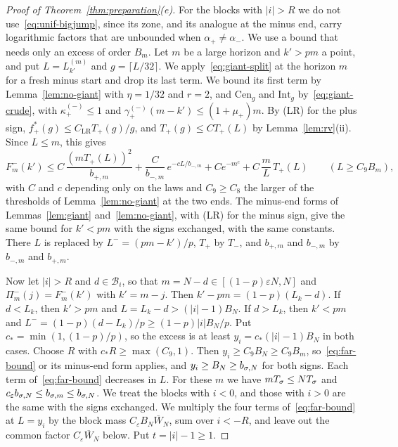 \begin{proof}[Proof of Theorem~\ref{thm:preparation}(e)]
For the blocks with $|i|>R$ we do not use~\eqref{eq:unif-bigjump}, since its zone,
and its analogue at the minus end, carry logarithmic factors that are unbounded when
$\alpha_\plus\ne\alpha_\minus$. We use a bound that needs only an excess of order
$B_m$. Let $m$ be a large horizon and $k'>pm$ a point, and put $L=L^{(m)}_{k'}$ and
$g=\lceil L/32\rceil$. We apply~\eqref{eq:giant-split} at the horizon $m$ for a fresh
minus start and drop its last term. We bound its first term by
Lemma~\ref{lem:no-giant} with $\eta=1/32$ and $r=2$, and $\mathrm{Cen}_g$ and
$\mathrm{Int}_g$ by~\eqref{eq:giant-crude}, with $\kappa^{(\minus)}_\plus\le1$ and
$\gamma^{(\minus)}_\plus(m-k')\le(1+\mu_\plus)m$. By (LR) for the plus sign,
$f^*_\plus(g)\le C_{\mathrm{LR}}T_\plus(g)/g$, and $T_\plus(g)\le CT_\plus(L)$ by
Lemma~\ref{lem:rv}(ii). Since $L\le m$, this gives
\begin{equation}\label{eq:far-bound}
 F^\minus_m(k')\le C\,\frac{(mT_\plus(L))^2}{b_{\plus,m}}+\frac C{b_{\minus,m}}\,e^{-cL/b_{\minus,m}}
 +Ce^{-m^c}+C\,\frac mL\,T_\plus(L)\qquad(L\ge C_9B_m),
\end{equation}
with $C$ and $c$ depending only on the laws and $C_9\ge C_8$ the larger of the
thresholds of Lemma~\ref{lem:no-giant} at the two ends. The minus-end forms of
Lemmas~\ref{lem:giant} and~\ref{lem:no-giant}, with (LR) for the minus sign, give
the same bound for $k'<pm$ with the signs exchanged, with the same constants. There
$L$ is replaced by $L^\minus=(pm-k')/p$, $T_\plus$ by $T_\minus$, and $b_{\plus,m}$ and
$b_{\minus,m}$ by $b_{\minus,m}$ and $b_{\plus,m}$.

Now let $|i|>R$ and $d\in\mathcal B_i$, so that $m=N-d\in[(1-p)\varepsilon N,N]$ and
$\Pi^\minus_m(j)=F^\minus_m(k')$ with $k'=m-j$. Then $k'-pm=(1-p)(L_k-d)$. If $d<L_k$,
then $k'>pm$ and $L=L_k-d>(|i|-1)B_N$. If $d>L_k$, then $k'<pm$ and
$L^\minus=(1-p)(d-L_k)/p\ge(1-p)|i|B_N/p$. Put $c_*=\min(1,(1-p)/p)$, so the excess
is at least $y_i=c_*(|i|-1)B_N$ in both cases. Choose $R$ with $c_*R\ge\max(C_9,1)$.
Then $y_i\ge C_9B_N\ge C_9B_m$, so~\eqref{eq:far-bound} or its minus-end form
applies, and $y_i\ge B_N\ge b_{\sigma,N}$ for both signs. Each term
of~\eqref{eq:far-bound} decreases in $L$. For these $m$ we have $mT_\sigma\le NT_\sigma$
and $c_\varepsilon b_{\sigma,N}\le b_{\sigma,m}\le b_{\sigma,N}$. We treat the blocks with
$i<0$, and those with $i>0$ are the same with the signs exchanged. We multiply the
four terms of~\eqref{eq:far-bound} at $L=y_i$ by the block mass
$C_\varepsilon B_N\overline W_N$, sum over $i<-R$, and leave out the common factor
$C_\varepsilon\overline W_N$ below. Put $t=|i|-1\ge1$.


\end{proof}
